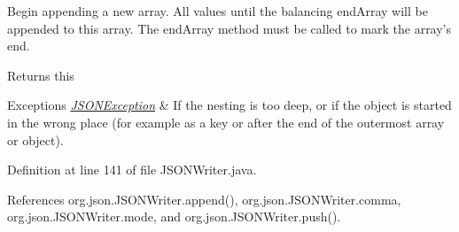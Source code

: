 Begin appending a new array. All values until the balancing {\ttfamily end\-Array} will be appended to this array. The {\ttfamily end\-Array} method must be called to mark the array's end. \begin{DoxyReturn}{Returns}
this 
\end{DoxyReturn}

\begin{DoxyExceptions}{Exceptions}
{\em \hyperlink{classorg_1_1json_1_1_j_s_o_n_exception}{J\-S\-O\-N\-Exception}} & If the nesting is too deep, or if the object is started in the wrong place (for example as a key or after the end of the outermost array or object). \\
\hline
\end{DoxyExceptions}


Definition at line 141 of file J\-S\-O\-N\-Writer.\-java.



References org.\-json.\-J\-S\-O\-N\-Writer.\-append(), org.\-json.\-J\-S\-O\-N\-Writer.\-comma, org.\-json.\-J\-S\-O\-N\-Writer.\-mode, and org.\-json.\-J\-S\-O\-N\-Writer.\-push().


